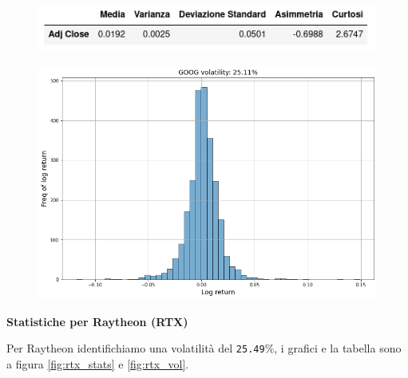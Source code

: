 \documentclass{article}
\begin{document}
\begin{figure}[h]
  \centering
  \begin{minipage}{.5\textwidth}
    \centering
    \vspace{4.85cm}
    \includegraphics[width=1\linewidth]{goog_stats.png}
    \label{fig:goog_stats}
  \end{minipage}%
  \begin{minipage}{.5\textwidth}
    \centering
    \includegraphics[width=1\linewidth]{goog_volatility.png}
    \label{fig:goog_vol}
  \end{minipage}
\end{figure}

\pagebreak

\textbf{Statistiche per Raytheon (RTX)}

Per Raytheon identifichiamo una volatilità del \verb|25.49|\%, i grafici e la tabella sono a figura \ref{fig:rtx_stats} e \ref{fig:rtx_vol}.
\end{document}
